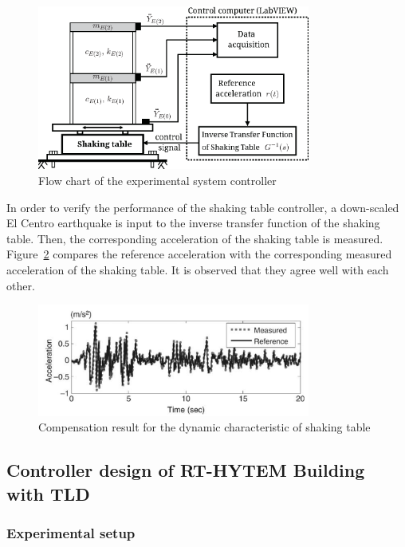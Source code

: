 \begin{figure}[ht]
\centering
\includegraphics[width=0.8\textwidth] {figure/2-8.eps}
\caption{Flow chart of the experimental system controller}
\label{fig:2-8}
\end{figure}

In order to verify the performance of the shaking table controller, a down-scaled El Centro earthquake is input to the inverse transfer function of the shaking table. Then, the corresponding acceleration of the shaking table is measured. Figure~\ref{fig:2-9} compares the reference acceleration with the corresponding measured acceleration of the shaking table. It is observed that they agree well with each other.

\begin{figure}[ht]
\centering
\includegraphics[width=0.8\textwidth] {figure/2-9.png}
\caption{Compensation result for the dynamic characteristic of shaking table}
\label{fig:2-9}
\end{figure}






\subsection{Controller design of RT-HYTEM Building with TLD}
\subsubsection{Experimental setup}

